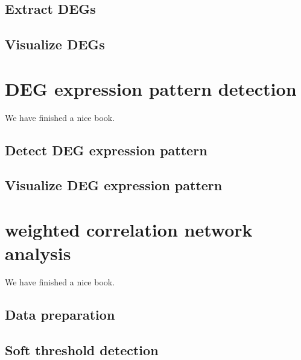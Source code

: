 \documentclass[
  a4paper,
  oneside]{book}
\begin{document}
\hypertarget{extract-degs}{%
\section{Extract DEGs}\label{extract-degs}}

\hypertarget{visualize-degs}{%
\section{Visualize DEGs}\label{visualize-degs}}

\hypertarget{deg-expression-pattern-detection}{%
\chapter{DEG expression pattern detection}\label{deg-expression-pattern-detection}}

We have finished a nice book.

\hypertarget{detect-deg-expression-pattern}{%
\section{Detect DEG expression pattern}\label{detect-deg-expression-pattern}}

\hypertarget{visualize-deg-expression-pattern}{%
\section{Visualize DEG expression pattern}\label{visualize-deg-expression-pattern}}

\hypertarget{weighted-correlation-network-analysis}{%
\chapter{weighted correlation network analysis}\label{weighted-correlation-network-analysis}}

We have finished a nice book.

\hypertarget{data-preparation}{%
\section{Data preparation}\label{data-preparation}}

\hypertarget{soft-threshold-detection}{%
\section{Soft threshold detection}\label{soft-threshold-detection}}
\end{document}
